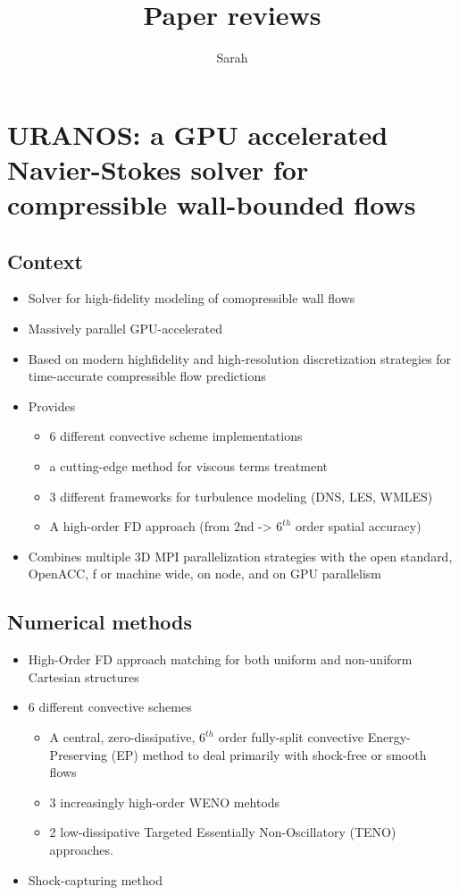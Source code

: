 \documentclass[10pt,a4paper]{article}
\author{Sarah}
\title{Paper reviews}
\begin{document}
\maketitle{}
\newpage

\section{URANOS: a GPU accelerated Navier-Stokes solver for compressible wall-bounded flows}
\subsection{Context}
\begin{itemize}
\item Solver for high-fidelity modeling of comopressible wall flows
\item Massively parallel GPU-accelerated
\item Based on modern high\-fidelity and high-resolution discretization strategies for time-accurate compressible flow predictions
\item Provides 
\begin{itemize}
\item 6 different convective scheme implementations
\item a cutting-edge method for viscous terms treatment
\item 3 different frameworks for turbulence modeling (DNS, LES, WMLES)
\item A high-order FD approach (from 2nd -> $6^{th}$ order spatial accuracy)
\end{itemize}
\item Combines multiple 3D MPI parallelization strategies with the open standard, OpenACC, f or machine wide, on node, and on GPU parallelism
\end{itemize} 
\subsection{Numerical methods}
\begin{itemize}
\item High-Order FD approach matching for both uniform and non-uniform Cartesian structures
\item 6 different convective schemes
\begin{itemize}
\item A central, zero-dissipative, $6^{th}$ order fully-split convective Energy-Preserving (EP) method to deal primarily with shock-free or smooth flows
\item 3 increasingly high-order WENO mehtods
\item 2 low-dissipative Targeted Essentially Non-Oscillatory (TENO) approaches.
\end{itemize}
\item Shock-capturing method

\end{itemize}
\end{document}
